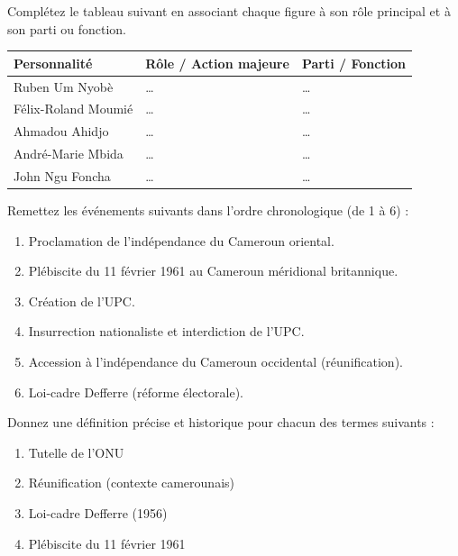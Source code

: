 \documentclass[11pt]{article}
\begin{document}
\begin{exercice}
Complétez le tableau suivant en associant chaque figure à son rôle principal et à son parti ou fonction.
\begin{center}
\begin{tabular}{|l|l|l|}
\hline
\textbf{Personnalité} & \textbf{Rôle / Action majeure} & \textbf{Parti / Fonction} \\
\hline
Ruben Um Nyobè & \ldots & \ldots \\
\hline
Félix-Roland Moumié & \ldots & \ldots \\
\hline
Ahmadou Ahidjo & \ldots & \ldots \\
\hline
André-Marie Mbida & \ldots & \ldots \\
\hline
John Ngu Foncha & \ldots & \ldots \\
\hline
\end{tabular}
\end{center}
\end{exercice}

\begin{exercice}
Remettez les événements suivants dans l'ordre chronologique (de 1 à 6) :
\begin{enumerate}
    \item Proclamation de l'indépendance du Cameroun oriental.
    \item Plébiscite du 11 février 1961 au Cameroun méridional britannique.
    \item Création de l'UPC.
    \item Insurrection nationaliste et interdiction de l'UPC.
    \item Accession à l'indépendance du Cameroun occidental (réunification).
    \item Loi-cadre Defferre (réforme électorale).
\end{enumerate}
\end{exercice}

\begin{exercice}
Donnez une définition précise et historique pour chacun des termes suivants :
\begin{enumerate}
    \item Tutelle de l'ONU
    \item Réunification (contexte camerounais)
    \item Loi-cadre Defferre (1956)
    \item Plébiscite du 11 février 1961
\end{enumerate}
\end{exercice}
\end{document}
